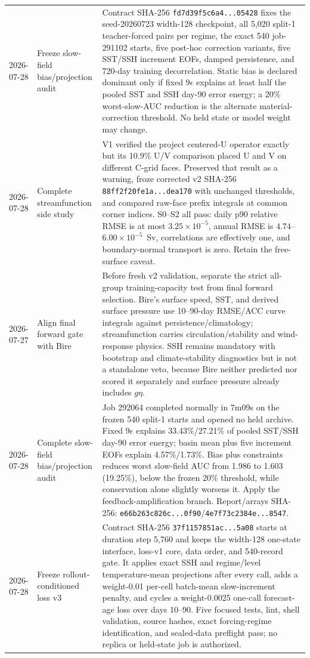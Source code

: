 \documentclass[11pt]{article}
\begin{document}
\begin{longtable}{@{}p{}p{}p{}@{}}
2026-07-28 & Freeze slow-field bias/projection audit & Contract SHA-256 \texttt{fd7d39f5c6a4...05428} fixes the seed-20260723 width-128 checkpoint, all 5,020 split-1 teacher-forced pairs per regime, the exact 540 job-291102 starts, five post-hoc correction variants, five SST/SSH increment EOFs, damped persistence, and 720-day training decorrelation.  Static bias is declared dominant only if fixed \(9\epsilon\) explains at least half the pooled SST and SSH day-90 error energy; a 20\% worst-slow-AUC reduction is the alternate material-correction threshold.  No held state or model weight may change. \\
2026-07-28 & Complete streamfunction side study & V1 verified the project centered-U operator exactly but its 10.9\% U/V comparison placed U and V on different C-grid faces.  Preserved that result as a warning, froze corrected v2 SHA-256 \texttt{88ff2f20fe1a...dea170} with unchanged thresholds, and compared raw-face prefix integrals at common corner indices.  S0--S2 all pass: daily p90 relative RMSE is at most \(3.25\times10^{-5}\), annual RMSE is \(4.74\)--\(6.00\times10^{-5}\)~Sv, correlations are effectively one, and boundary-normal transport is zero.  Retain the free-surface caveat. \\
2026-07-27 & Align final forward gate with Bire & Before fresh v2 validation, separate the strict all-group training-capacity test from final forward selection.  Bire's surface speed, SST, and derived surface pressure use 10--90-day RMSE/ACC curve integrals against persistence/climatology; streamfunction carries circulation/stability and wind-response physics.  SSH remains mandatory with bootstrap and climate-stability diagnostics but is not a standalone veto, because Bire neither predicted nor scored it separately and surface pressure already includes \(g\eta\). \\
2026-07-28 & Complete slow-field bias/projection audit & Job 292064 completed normally in 7m09s on the frozen 540 split-1 starts and opened no held archive.  Fixed \(9\epsilon\) explains 33.43\%/27.21\% of pooled SST/SSH day-90 error energy; basin mean plus five increment EOFs explain 4.57\%/1.73\%.  Bias plus constraints reduces worst slow-field AUC from 1.986 to 1.603 (19.25\%), below the frozen 20\% threshold, while conservation alone slightly worsens it.  Apply the feedback-amplification branch.  Report/arrays SHA-256: \texttt{e66b263c826c...0f90}/\texttt{4e7f73c2384e...8547}. \\
2026-07-28 & Freeze rollout-conditioned loss v3 & Contract SHA-256 \texttt{37f1157851ac...5a08} starts at duration step 5,760 and keeps the width-128 one-state interface, loss-v1 core, data order, and 540-record gate.  It applies exact SSH and regime/level temperature-mean projections after every call, adds a weight-0.01 per-cell batch-mean slow-increment penalty, and cycles a weight-0.0025 one-call forecast-age loss over days 10--90.  Five focused tests, lint, shell validation, source hashes, exact forcing-regime identification, and sealed-data preflight pass; no replica or held-state job is authorized. \\

\end{longtable}
\end{document}
